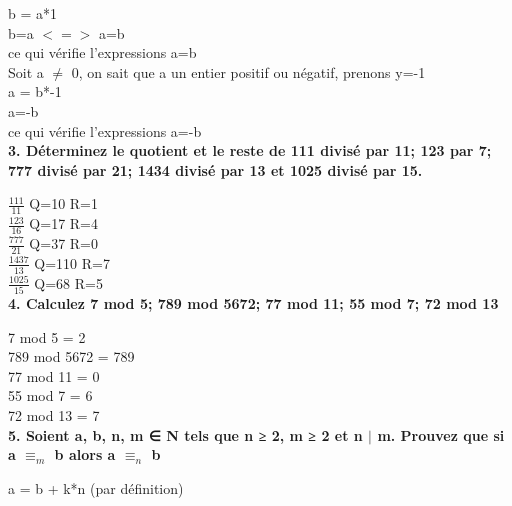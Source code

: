 b = a*1 \\

b=a $<=>$ a=b \\
ce qui vérifie l'expressions a=b \\

Soit a $\ne$ 0, on sait que a un entier positif ou négatif, prenons y=-1 \\

a = b*-1 \\
a=-b \\
ce qui vérifie l'expressions a=-b \\

\newpage
\vspace{10mm}
\textbf{3. Déterminez le quotient et le reste de 111 divisé par 11; 123 par 7; 777 divisé par 21; 1434 divisé par 13 et 1025 divisé par 15.}

\vspace{4mm}

$\frac{111}{11}$  Q=10  R=1 \\

$\frac{123}{16}$  Q=17  R=4 \\

$\frac{777}{21}$  Q=37  R=0 \\

$\frac{1437}{13}$ Q=110 R=7 \\

$\frac{1025}{15}$ Q=68  R=5 \\

\vspace{10mm}
\textbf{4. Calculez 7 mod 5; 789 mod 5672; 77 mod 11; 55 mod 7; 72 mod 13}

\vspace{4mm}

7 mod 5 = 2 \\

789 mod 5672 = 789 \\

77 mod 11 = 0 \\

55 mod 7 = 6 \\

72 mod 13 = 7 \\

\vspace{10mm}
\textbf{5. Soient a, b, n, m ∈ N tels que n ≥ 2, m ≥ 2 et n $|$ m. Prouvez que si a $≡_{m}$ b alors a $≡_{n}$ b}

\vspace{4mm}
a = b + k*n (par définition) \\

